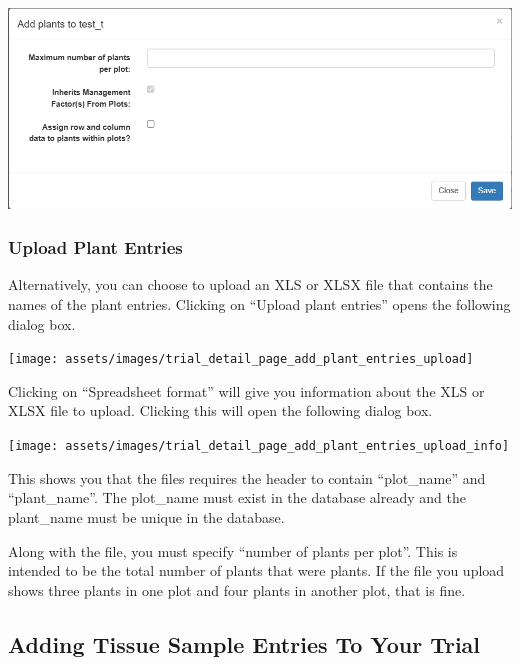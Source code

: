 \documentclass[
  12pt,
]{book}
\begin{document}
\begin{center}\includegraphics[width=0.95\linewidth]{assets/images/trial_detail_page_add_plant_entries_autogenerated} \end{center}

\hypertarget{upload-plant-entries}{%
\subsubsection*{Upload Plant Entries}\label{upload-plant-entries}}


Alternatively, you can choose to upload an XLS or XLSX file that contains the names of the plant entries. Clicking on ``Upload plant entries'' opens the following dialog box.

\begin{center}\texttt{[image: assets/images/trial\_detail\_page\_add\_plant\_entries\_upload]} \end{center}

Clicking on ``Spreadsheet format'' will give you information about the XLS or XLSX file to upload. Clicking this will open the following dialog box.

\begin{center}\texttt{[image: assets/images/trial\_detail\_page\_add\_plant\_entries\_upload\_info]} \end{center}

This shows you that the files requires the header to contain ``plot\_name'' and ``plant\_name''. The plot\_name must exist in the database already and the plant\_name must be unique in the database.

Along with the file, you must specify ``number of plants per plot''. This is intended to be the total number of plants that were plants. If the file you upload shows three plants in one plot and four plants in another plot, that is fine.

\hypertarget{adding-tissue-sample-entries-to-your-trial}{%
\subsection{Adding Tissue Sample Entries To Your Trial}\label{adding-tissue-sample-entries-to-your-trial}}
\end{document}
